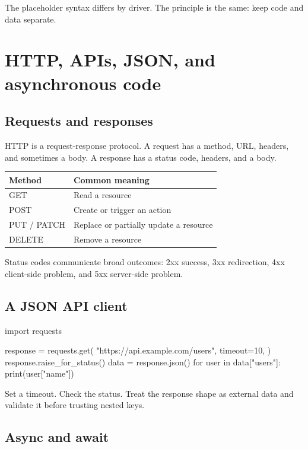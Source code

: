 \documentclass[11pt,openany,oneside]{book}
\begin{document}
The placeholder syntax differs by driver. The principle is the same: keep code and data separate.

\chapter{HTTP, APIs, JSON, and asynchronous code}

\section{Requests and responses}

HTTP is a request-response protocol. A request has a method, URL, headers, and sometimes a body. A response has a status code, headers, and a body.

\begin{tabularx}{\textwidth}{>{\ttfamily}p{} X}
\toprule
Method & Common meaning \\
\midrule
GET & Read a resource \\
POST & Create or trigger an action \\
PUT / PATCH & Replace or partially update a resource \\
DELETE & Remove a resource \\
\bottomrule
\end{tabularx}

Status codes communicate broad outcomes: 2xx success, 3xx redirection, 4xx client-side problem, and 5xx server-side problem.

\section{A JSON API client}

\begin{code}[language=Python]
import requests

response = requests.get(
    "https://api.example.com/users",
    timeout=10,
)
response.raise_for_status()
data = response.json()
for user in data["users"]:
    print(user["name"])
\end{code}

Set a timeout. Check the status. Treat the response shape as external data and validate it before trusting nested keys.

\section{Async and await}
\end{document}
